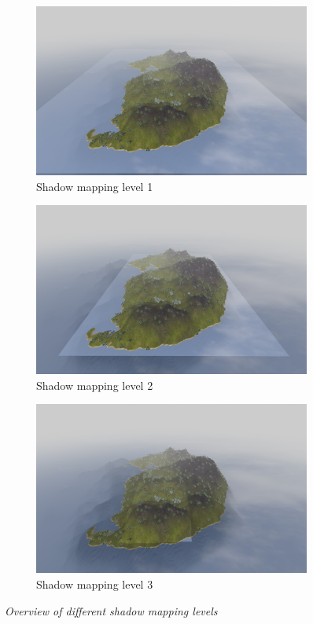 \begin{figure}[H]
\begin{subfigure}{.33\textwidth}
  \centering
  \includegraphics[width=0.9\linewidth]{images/SMOverViewLvl1.png}
  \caption{Shadow mapping level 1}
  \label{fig:SMOverViewLvl1}
\end{subfigure}%
\begin{subfigure}{.33\textwidth}
  \centering
  \includegraphics[width=0.9\linewidth]{images/SMOverViewLvl2.png}
  \caption{Shadow mapping level 2}
  \label{fig:SMOverViewLvl1}
\end{subfigure}
\begin{subfigure}{.33\textwidth}
  \centering
  \includegraphics[width=0.9\linewidth]{images/SMOverViewLvl3.png}
  \caption{Shadow mapping level 3}
  \label{fig:SMOverViewLvl1}
\end{subfigure}
\caption[Noise comparison]{\textit{Overview of different shadow mapping levels}}
\label{fig:SMOverViewComparison}
\end{figure}

